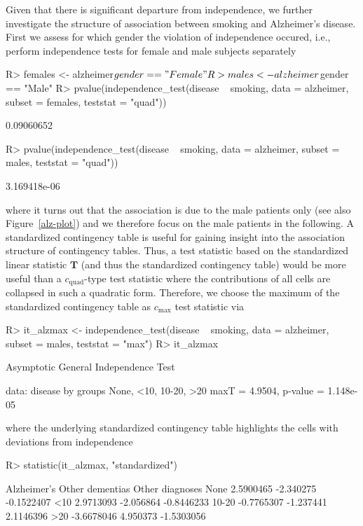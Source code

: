 \documentclass{article}
\newcommand{\T}{\mathbf{T}}
\newenvironment{Schunk}{}{}
\begin{document}
Given that there is significant departure from independence, we further
investigate the structure of association between smoking and Alzheimer's
disease. First we assess for which gender the violation of independence 
occured, i.e., perform independence tests for female and male
subjects separately
\begin{Schunk}
\begin{Sinput}
R> females <- alzheimer$gender == "Female"
R> males <- alzheimer$gender == "Male"
R> pvalue(independence_test(disease ~ smoking, data = alzheimer, 
       subset = females, teststat = "quad"))
\end{Sinput}
\begin{Soutput}
[1] 0.09060652
\end{Soutput}
\begin{Sinput}
R> pvalue(independence_test(disease ~ smoking, data = alzheimer, 
       subset = males, teststat = "quad"))
\end{Sinput}
\begin{Soutput}
[1] 3.169418e-06
\end{Soutput}
\end{Schunk}
where it turns out that the association is due to the male patients only
(see also Figure~\ref{alz-plot}) and we therefore focus on the male patients in 
the following.
A standardized contingency table is useful for gaining insight into the 
association structure of contingency tables. 
Thus, a test statistic based on the standardized linear statistic 
$\T$ (and thus the standardized contingency table) would be more useful than a
$c_\text{quad}$-type test statistic where the contributions of all cells are 
collapsed in such a quadratic form. Therefore, we choose the 
maximum of the standardized contingency table as $c_\text{max}$ test statistic via
\begin{Schunk}
\begin{Sinput}
R> it_alzmax <- independence_test(disease ~ smoking, 
       data = alzheimer, subset = males, teststat = "max")
R> it_alzmax
\end{Sinput}
\begin{Soutput}
	Asymptotic General Independence Test

data:  disease by groups None, <10, 10-20, >20 
maxT = 4.9504, p-value = 1.148e-05
\end{Soutput}
\end{Schunk}
where the underlying standardized contingency table highlights the cells with
deviations from independence
\begin{Schunk}
\begin{Sinput}
R> statistic(it_alzmax, "standardized")
\end{Sinput}
\begin{Soutput}
      Alzheimer's Other dementias Other diagnoses
None    2.5900465       -2.340275      -0.1522407
<10     2.9713093       -2.056864      -0.8446233
10-20  -0.7765307       -1.237441       2.1146396
>20    -3.6678046        4.950373      -1.5303056
\end{Soutput}
\end{Schunk}
\end{document}
